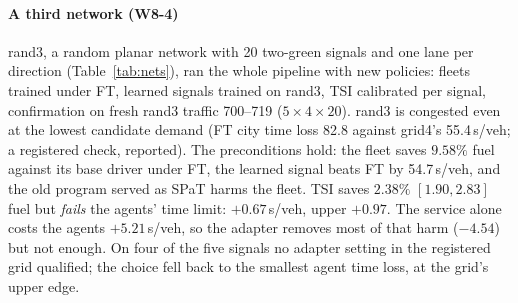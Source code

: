 \paragraph{A third network (W8-4)} rand3, a random planar network with 20 two-green signals and one lane per direction
(Table~\ref{tab:nets}), ran the whole pipeline with new policies: fleets trained under FT, learned signals trained on rand3, TSI calibrated
per signal, confirmation on fresh rand3 traffic 700--719 ($5\times4\times20$). rand3 is congested even at the lowest candidate demand
(FT city time loss 82.8 against grid4's 55.4\,s/veh; a registered check, reported). The preconditions hold: the fleet saves $9.58\%$ fuel
against its base driver under FT, the learned signal beats FT by 54.7\,s/veh, and the old program served as SPaT harms the fleet. TSI
saves $2.38\%$ $[1.90,2.83]$ fuel but \emph{fails} the agents' time limit: $+0.67$\,s/veh, upper $+0.97$. The service alone costs the
agents $+5.21$\,s/veh, so the adapter removes most of that harm ($-4.54$) but not enough. On four of the five signals no adapter setting in
the registered grid qualified; the choice fell back to the smallest agent time loss, at the grid's upper edge.

